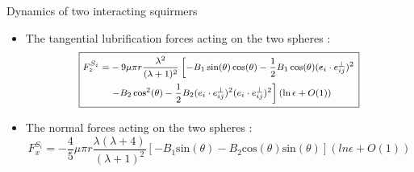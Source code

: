 \documentclass{beamer}
\begin{document}
    \begin{frame}{Dynamics of two interacting squirmers}
        \begin{itemize}
            \item The tangential lubrification forces acting on the two spheres : \begin{equation*}
    \footnotesize
    \boxed{
        \begin{aligned}
        F_z^{S_i} = & -9 \mu \pi r \frac{\lambda ^2}{(\lambda +1)^2} \left[ -B_1 \sin(\theta)\cos(\theta) - \frac{1}{2} B_1  \cos(\theta) (e_i \cdot e^{\perp}_{ij})^2 \right. \\
        & \left. -B_2 \cos^2(\theta) - \frac{1}{2} B_2 (e_i \cdot e^{\perp}_{ij})^2 (e_i \cdot e^{\perp}_{ij})^2 \right] (\ln \epsilon + O(1))
        \end{aligned}
    }
    \end{equation*}
        \item The normal forces acting on the two spheres :
        \begin{equation*}
        \boxed{F_x^{S_i} = -\frac{4}{5} \mu \pi r \frac{\lambda(\lambda +4)}{(\lambda +1)^2} \left[ -B_1\mathrm{sin}(\theta) -B_2\mathrm{cos}(\theta)\mathrm{sin}(\theta)\right] (ln \epsilon + O(1))}
    \end{equation*}
        \end{itemize}
    
\end{frame}
    
\end{document}
